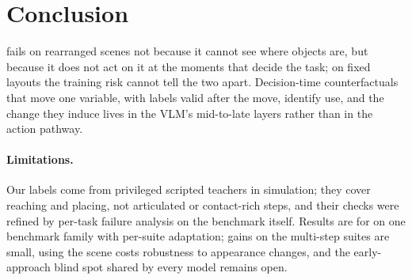 \section{Conclusion}
\label{sec:conclusion}

\pizf fails on rearranged scenes not because it cannot see where objects are, but because it does not act on it at the
moments that decide the task; on fixed layouts the training risk cannot tell the two apart.
Decision-time counterfactuals that move one variable, with labels valid after the move, identify use, and the change they
induce lives in the VLM's mid-to-late layers rather than in the action pathway.

\paragraph{Limitations.}
Our labels come from privileged scripted teachers in simulation; they cover reaching and placing, not articulated or
contact-rich steps, and their checks were refined by per-task failure analysis on the benchmark itself.
Results are for \pizf on one benchmark family with per-suite adaptation; gains on the multi-step suites are small, using the
scene costs robustness to appearance changes, and the early-approach blind spot shared by every model remains open.

